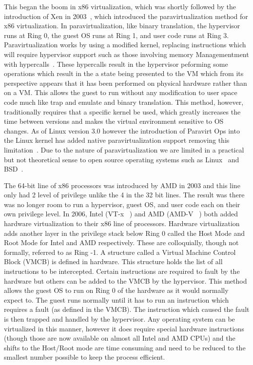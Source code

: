This began the boom in x86 virtualization, which was shortly followed by the introduction of Xen in 2003~\cite{barham_xen_2003}, which introduced the paravirtualization method for x86 virtualization. In paravirtualization, like binary translation, the hypervisor runs at Ring 0, the guest OS runs at Ring 1, and user code runs at Ring 3.  Paravirtualization works by using a modified kernel, replacing instructions which will require hypervisor support such as those involving memory Managementment with hypercalls~\cite{barham_xen_2003}.  These hypercalls result in the hypervisor peforming some operations which result in the a state being presented to the VM which from its perspective appears that it has been performed on physical hardware rather than on a VM. This allows the guest to run without any modification to user space code much like trap and emulate and binary translation. This method, however, traditionally requires that a specific kernel be used, which greatly increases the time between versions and makes the virtual environment sensitive to OS changes. As of Linux version 3.0 however the introduction of Paravirt Ops into the Linux kernel has added native paravirtualization support removing this limitation~\cite{_understanding_????}. Due to the nature of paravirtualization we are limited in a practical but not theoretical sense to open source operating systems such as Linux~\cite{_Linux_archive} and BSD~\cite{mckusick_design_2004}.

The 64-bit line of x86 processors was introduced by AMD in 2003 and this line only had 2 level of privilege unlike the 4 in the 32 bit lines. The result was there was no longer room to run a hypervisor, guest OS, and user code each on their own privilege level. In 2006, Intel (VT-x ~\cite{neiger_intel_2006}) and AMD (AMD-V ~\cite{codenamed_pacifica_2005}) both added hardware virtualization to their x86 line of processors. Hardware virtualization adds another layer in the privilege stack below Ring 0 called the Host Mode and Root Mode for Intel and AMD respectively. These are colloquially, though not formally, referred to as Ring -1. A structure called a Virtual Machine Control Block (VMCB) is defined in hardware. This structure holds the list of all instructions to be intercepted. Certain instructions are required to fault by the hardware but others can be added to the VMCB by the hypervisor. This method allows the guest OS to run on Ring 0 of the hardware as it would normally expect to. The guest runs normally until it has to run an instruction which requires a fault (as defined in the VMCB). The instruction which caused the fault is then trapped and handled by the hypervisor. Any operating system can be virtualized in this manner, however it does require special hardware instructions (though those are now available on almost all Intel and AMD CPUs) and the shifts to the Host/Root mode are time consuming and need to be reduced to the smallest number possible to keep the process efficient.

